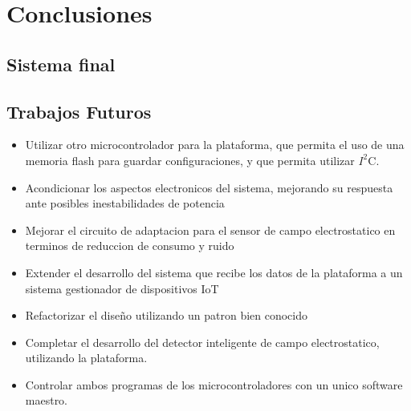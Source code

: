 \chapter{Conclusiones} %
\label{cha:conclusiones}

\section{Sistema final} %
\label{sec:sistema_final}






\section{Trabajos Futuros} %
\label{sec:trabajos_futuros}

\begin{itemize}
	\item Utilizar otro microcontrolador para la plataforma, que permita el uso de una memoria flash para guardar configuraciones, y que permita utilizar $I^{2}$C.
	\item Acondicionar los aspectos electronicos del sistema, mejorando su respuesta ante posibles inestabilidades de potencia
	\item Mejorar el circuito de adaptacion para el sensor de campo electrostatico en terminos de reduccion de consumo y ruido
	\item Extender el desarrollo del sistema que recibe los datos de la plataforma a un sistema gestionador de dispositivos IoT
	\item Refactorizar el diseño utilizando un patron bien conocido
	\item Completar el desarrollo del detector inteligente de campo electrostatico, utilizando la plataforma.
	\item Controlar ambos programas de los microcontroladores con un unico software maestro.
\end{itemize}



